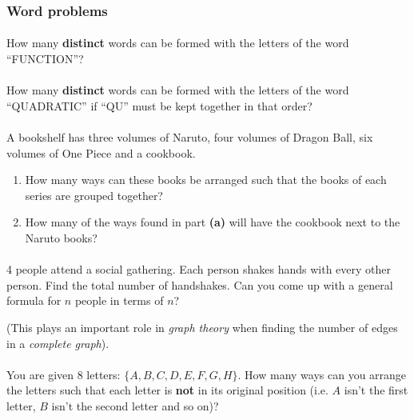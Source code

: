 \documentclass[12pt, a4paper, titlepage, twoside]{article}
\begin{document}
	\subsubsection*{Word problems}
	
	\paragraph{}
	 How many \textbf{distinct} words can be formed with the letters of the word ``FUNCTION''?
	
	\paragraph{}
	 How many \textbf{distinct} words can be formed with the letters of the word ``QUADRATIC'' if
	``QU'' must be kept together in that order?
	
	\paragraph{}
	 A bookshelf has three volumes of Naruto, four volumes of Dragon Ball, six volumes of One Piece and
	a cookbook.
	
	\begin{enumerate}[label=\textbf{(\alph*)}]
		\item How many ways can these books be arranged such that the books of each series are grouped together?
		\item How many of the ways found in part \textbf{(a)} will have the cookbook next to the Naruto books?
	\end{enumerate}
	
	\paragraph{}
	 4 people attend a social gathering. Each person shakes hands with every other person. Find the 
	total number of handshakes. Can you come up with a general formula for $n$ people in terms of $n$?
	
	(This plays an important role in \textit{graph theory} when finding the number of edges in a \textit{complete graph}).

	\paragraph{}
	 You are given 8 letters: $\{A,B,C,D,E,F,G,H\}$. How many ways can you arrange the letters such that 
	each letter is \textbf{not} in its original position  (i.e. $A$ isn't the first letter, $B$ isn't the second letter and so on)?
	
\end{document}
